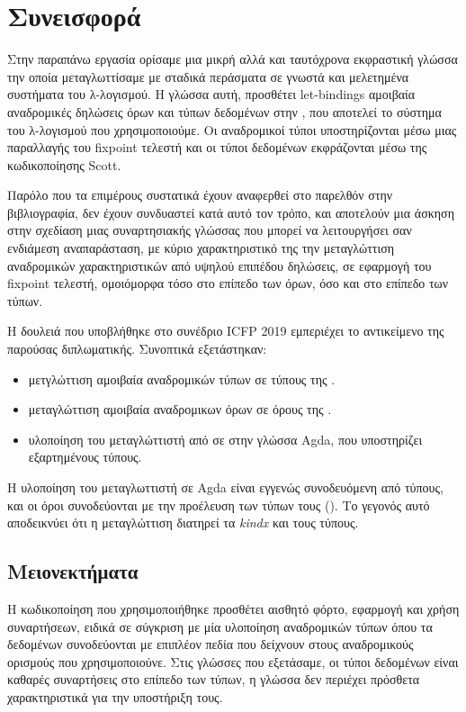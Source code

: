 \section{Συνεισφορά}
Στην παραπάνω εργασία ορίσαμε μια μικρή αλλά και ταυτόχρονα εκφραστική γλώσσα
την οποία μεταγλωττίσαμε με σταδικά περάσματα σε γνωστά και μελετημένα συστήματα του λ-λογισμού.
Η γλώσσα αυτή, \FIR{} προσθέτει let-bindings αμοιβαία αναδρομικές δηλώσεις όρων και τύπων δεδομένων
στην \FOMF, που αποτελεί το σύστημα του λ-λογισμού που χρησιμοποιούμε. Οι αναδρομικοί τύποι
υποστηρίζονται μέσω μιας παραλλαγής του fixpoint τελεστή και οι τύποι δεδομένων εκφράζονται
μέσω της κωδικοποίησης Scott.

Παρόλο που τα επιμέρους συστατικά έχουν αναφερθεί στο παρελθόν στην βιβλιογραφία, δεν έχουν
συνδυαστεί κατά αυτό τον τρόπο, και αποτελούν μια άσκηση στην σχεδίαση μιας συναρτησιακής
γλώσσας που μπορεί να λειτουργήσει σαν ενδιάμεση αναπαράσταση, με κύριο χαρακτηριστικό της
την μεταγλώττιση αναδρομικών χαρακτηριστικών από υψηλού επιπέδου δηλώσεις, σε εφαρμογή
του fixpoint τελεστή, ομοιόμορφα τόσο στο επίπεδο των όρων, όσο και στο επίπεδο των τύπων.

Η δουλειά που υποβλήθηκε στο συνέδριο ICFP 2019 εμπεριέχει το αντικείμενο της παρούσας διπλωματικής. Συνοπτικά
εξετάστηκαν:
\begin{itemize}
\item μετγλώττιση αμοιβαία αναδρομικών τύπων σε τύπους της \FOMF{}.
\item μεταγλώττιση αμοιβαία αναδρομικων όρων σε όρους της \FOMF{}.
\item υλοποίηση του μεταγλώττιστή από \FIR{} σε \FOMF{} στην γλώσσα Agda, που υποστηρίζει
εξαρτημένους τύπους.

\end{itemize}
Η υλοποίηση του μεταγλωττιστή σε Agda είναι εγγενώς συνοδευόμενη από τύπους, και οι όροι συνοδεύονται με την προέλευση των τύπων τους (\cite{altenkirch}). Το γεγονός αυτό αποδεικνύει ότι η μεταγλώττιση διατηρεί τα \emph{kindx} και τους τύπους.


\subsection{Μειονεκτήματα}

Η κωδικοποίηση που χρησιμοποιήθηκε προσθέτει αισθητό φόρτο, εφαρμογή και χρήση συναρτήσεων, ειδικά
σε σύγκριση με μία υλοποίηση αναδρομικών τύπων όπου τα δεδομένων συνοδεύονται με επιπλέον πεδία που
δείχνουν στους αναδρομικούς ορισμούς που χρησιμοποιούνε. Στις γλώσσες που εξετάσαμε, οι τύποι δεδομένων είναι καθαρές συναρτήσεις στο επίπεδο των τύπων, η γλώσσα δεν περιέχει πρόσθετα χαρακτηριστικά για την υποστήριξη τους.

